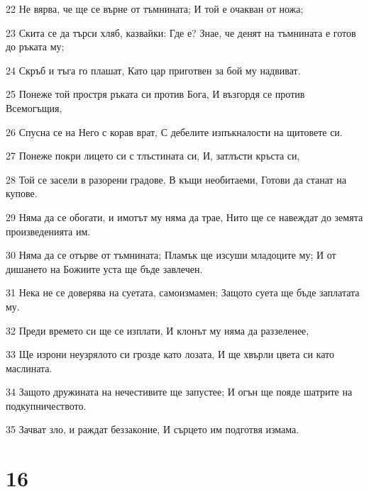 \par 22 Не вярва, че ще се върне от тъмнината; И той е очакван от ножа;
\par 23 Скита се да търси хляб, казвайки: Где е? Знае, че денят на тъмнината е готов до ръката му;
\par 24 Скръб и тъга го плашат, Като цар приготвен за бой му надвиват.
\par 25 Понеже той простря ръката си против Бога, И възгордя се против Всемогъщия,
\par 26 Спусна се на Него с корав врат, С дебелите изпъкналости на щитовете си.
\par 27 Понеже покри лицето си с тлъстината си, И, затлъсти кръста си,
\par 28 Той се засели в разорени градове, В къщи необитаеми, Готови да станат на купове.
\par 29 Няма да се обогати, и имотът му няма да трае, Нито ще се навеждат до земята произведенията им.
\par 30 Няма да се отърве от тъмнината; Пламък ще изсуши младоците му; И от дишането на Божиите уста ще бъде завлечен.
\par 31 Нека не се доверява на суетата, самоизмамен; Защото суета ще бъде заплатата му.
\par 32 Преди времето си ще се изплати, И клонът му няма да раззеленее,
\par 33 Ще изрони неузрялото си грозде като лозата, И ще хвърли цвета си като маслината.
\par 34 Защото дружината на нечестивите ще запустее; И огън ще пояде шатрите на подкупничеството.
\par 35 Зачват зло, и раждат беззаконие, И сърцето им подготвя измама.

\chapter{16}

